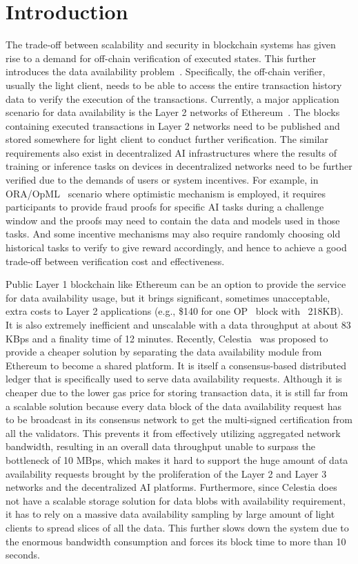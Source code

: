 \section{Introduction}

The trade-off between scalability and security in blockchain systems has given rise to a demand for off-chain verification of executed states. This further introduces the data availability problem~\cite{da}. Specifically, the off-chain verifier, usually the light client, needs to be able to access the entire transaction history data to verify the execution of the transactions. 
Currently, a major application scenario for data availability is the Layer 2 networks of Ethereum~\cite{Ethereum}. The blocks containing executed transactions in Layer 2 networks need to be published and stored somewhere for light client to conduct further verification. The similar requirements also exist in decentralized AI infrastructures where the results of training or inference tasks on devices in decentralized networks need to be further verified due to the demands of users or system incentives. 
For example, in ORA/OpML~\cite{opml} scenario where optimistic mechanism is employed, it requires participants to provide fraud proofs for specific AI tasks during a challenge window and the proofs may need to contain the data and models used in those tasks. 
And some incentive mechanisms may also require randomly choosing old historical tasks to verify to give reward accordingly, and hence to achieve a good trade-off between verification cost and effectiveness. 

Public Layer 1 blockchain like Ethereum can be an option to provide the service for data availability usage, but it brings significant, sometimes unacceptable, extra costs to Layer 2 applications (e.g., \$140 for one OP~\cite{op} block with ~218KB). It is also extremely inefficient and unscalable with a data throughput at about 83 KBps and a finality time of 12 minutes. Recently, Celestia~\cite{celestia} was proposed to provide a cheaper solution by separating the data availability module from Ethereum to become a shared platform. It is itself a consensus-based distributed ledger that is specifically used to serve data availability requests. Although it is cheaper due to the lower gas price for storing transaction data, it is still far from a scalable solution because every data block of the data availability request has to be broadcast in its consensus network to get the multi-signed certification from all the validators. This prevents it from effectively utilizing aggregated network bandwidth, resulting in an overall data throughput unable to surpass the bottleneck of 10 MBps, which makes it hard to support the huge amount of data availability requests brought by the proliferation of the Layer 2 and Layer 3 networks and the decentralized AI platforms. 
Furthermore, since Celestia does not have a scalable storage solution for data blobs with availability requirement, it has to rely on a massive data availability sampling by large amount of light clients to spread slices of all the data. This further slows down the system due to the enormous bandwidth consumption and forces its block time to more than 10 seconds. 

